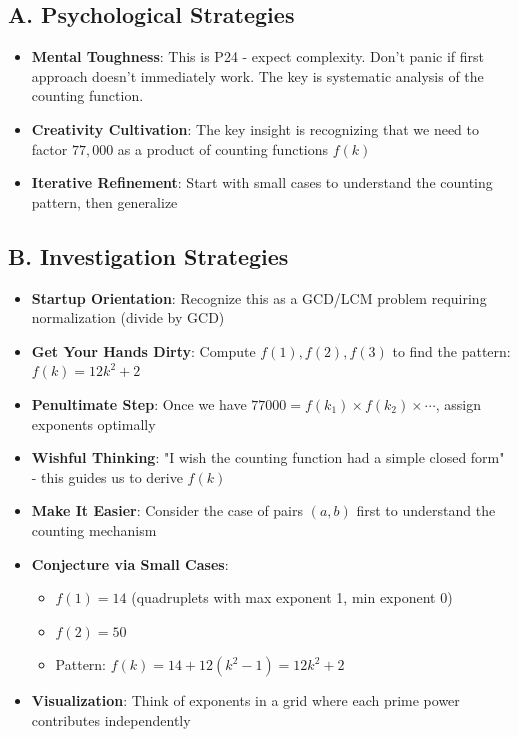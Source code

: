 \documentclass[11pt]{article}
\begin{document}
\begin{strategicbox}
\subsection*{A. Psychological Strategies}
\begin{itemize}[leftmargin=*]
    \item \textbf{Mental Toughness}: This is P24 - expect complexity. Don't panic if first approach doesn't immediately work. The key is systematic analysis of the counting function.
    \item \textbf{Creativity Cultivation}: The key insight is recognizing that we need to factor $77,000$ as a product of counting functions $f(k)$
    \item \textbf{Iterative Refinement}: Start with small cases to understand the counting pattern, then generalize
\end{itemize}

\subsection*{B. Investigation Strategies}
\begin{itemize}[leftmargin=*]
    \item \textbf{Startup Orientation}: Recognize this as a GCD/LCM problem requiring normalization (divide by GCD)
    \item \textbf{Get Your Hands Dirty}: Compute $f(1), f(2), f(3)$ to find the pattern: $f(k) = 12k^2 + 2$
    \item \textbf{Penultimate Step}: Once we have $77000 = f(k_1) \times f(k_2) \times \cdots$, assign exponents optimally
    \item \textbf{Wishful Thinking}: "I wish the counting function had a simple closed form" - this guides us to derive $f(k)$
    \item \textbf{Make It Easier}: Consider the case of pairs $(a,b)$ first to understand the counting mechanism
    \item \textbf{Conjecture via Small Cases}: 
    \begin{itemize}
        \item $f(1) = 14$ (quadruplets with max exponent 1, min exponent 0)
        \item $f(2) = 50$
        \item Pattern: $f(k) = 14 + 12(k^2-1) = 12k^2 + 2$
    \end{itemize}
    \item \textbf{Visualization}: Think of exponents in a grid where each prime power contributes independently
\end{itemize}


\end{strategicbox}
\end{document}
